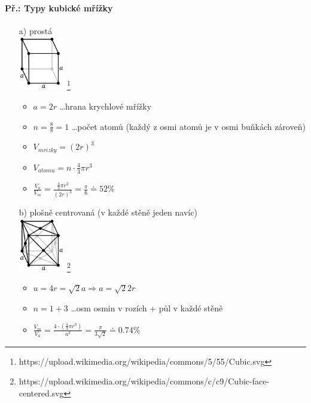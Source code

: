 \paragraph{Př.: Typy kubické mřížky}
\begin{itemize}
\item[a)] prostá \\
\includegraphics[width=2cm]{pictures/Cubic.png} \footnote{https://upload.wikimedia.org/wikipedia/commons/5/55/Cubic.svg}
\begin{itemize}
\item $a = 2r$ \ldots hrana krychlové mřížky
\item $n = \frac{8}{8} = 1$ \ldots počet atomů (každý z osmi atomů je v osmi buňkách zároveň)
\item $V_{mrizky} = (2r)^3$
\item $V_{atomu} = n \cdot \frac{4}{3} \pi r^3$
\item $\frac{V_a}{V_m} = \frac{\frac{4}{3} \pi r^3}{(2r)^3} = \frac{\pi}{6} \doteq 52\%$
\end{itemize}

\item[b)] plošně centrovaná (v každé stěně jeden navíc) \\
\includegraphics[width=2cm]{pictures/Cubic-face-centered.png} \footnote{https://upload.wikimedia.org/wikipedia/commons/c/c9/Cubic-face-centered.svg}
\begin{itemize}
\item $u = 4r = \sqrt{2}a \Rightarrow a = \sqrt{2}2r$
\item $n = 1+3$ \ldots osm osmin v rozích + půl v každé stěně
\item $\frac{V_m}{V_a} = \frac{4 \cdot (\frac{4}{3}\pi r^3)}{a^3} = \frac{\pi}{3\sqrt{2}} \doteq 0.74\%$
\end{itemize}


\end{itemize}
